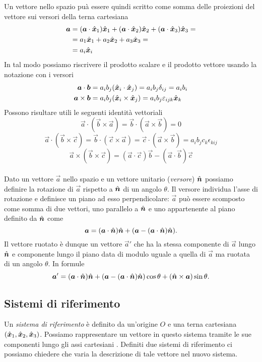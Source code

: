 Un vettore nello spazio puà essere quindi scritto come somma delle proiezioni del vettore sui versori della terna cartesiana 
\begin{align*}
\boldsymbol{a} & = (\boldsymbol{a} \cdot \hat{\boldsymbol{x}}_1) \hat{\boldsymbol{x}}_1 + (\boldsymbol{a} \cdot \hat{\boldsymbol{x}}_2) \hat{\boldsymbol{x}}_2 + (\boldsymbol{a} \cdot \hat{\boldsymbol{x}}_3) \hat{\boldsymbol{x}}_3 = \\
& = a_1 \hat{\boldsymbol{x}}_1 + a_2 \hat{\boldsymbol{x}}_2 + a_3 \hat{\boldsymbol{x}}_3 = \\
& = a_i \hat{\boldsymbol{x}}_i
\end{align*}
In tal modo possiamo riscrivere il prodotto scalare e il prodotto vettore usando la notazione con i versori
\begin{align}\label{dot_product}
\boldsymbol{a} \cdot \boldsymbol{b} & = a_i b_j (\hat{\boldsymbol{x}}_i \cdot \hat{\boldsymbol{x}}_j) = a_i b_j \delta_{ij} = a_i b_i \\
\label{cross product}
\boldsymbol{a} \times \boldsymbol{b} & = a_i b_j (\hat{\boldsymbol{x}}_i \times \hat{\boldsymbol{x}}_j) = a_i b_j \varepsilon_{ijk} \hat{\boldsymbol{x}}_k
\end{align}
Possono risultare utili le seguenti identità vettoriali
\[\vec a \cdot (\vec b \times \vec a) = \vec b \cdot (\vec a \times \vec b) = 0\] 
\[\vec a \cdot (\vec b \times \vec c) = \vec b \cdot (\vec c \times \vec a) = \vec c \cdot (\vec a \times \vec b) = a_i b_j c_k \epsilon_{kij}\]
\[\vec a \times (\vec b \times \vec c) = (\vec a \cdot \vec c) \vec b - (\vec a \cdot \vec b) \vec c\] \\

Dato un vettore $ \vec a $ nello spazio e un vettore unitario (\emph{versore}) $ \hat{\boldsymbol{n}} $ possiamo definire la rotazione di $ \vec a $ rispetto a $ \hat{\boldsymbol{n}} $ di un angolo $ \theta $. Il versore individua l'asse di rotazione e definisce un piano ad esso perpendicolare: $ \vec a $ può essere scomposto come somma di due vettori, uno parallelo a $ \hat{\boldsymbol{n}} $ e uno appartenente al piano definito da $ \hat{\boldsymbol{n}} $ come \[\boldsymbol{a} = (\boldsymbol{a} \cdot \hat{\boldsymbol{n}}) \hat{\boldsymbol{n}} + (\boldsymbol{a} - (\boldsymbol{a} \cdot \hat{\boldsymbol{n}}) \hat{\boldsymbol{n}}).\]
Il vettore ruotato è dunque un vettore $ \vec a' $ che ha la stessa componente di $ \vec a $ lungo $ \hat{\boldsymbol{n}} $ e componente lungo il piano data di modulo uguale a quella di $ \vec a $ ma ruotata di un angolo $ \theta $. In formule \[\boldsymbol{a}' = (\boldsymbol{a} \cdot \hat{\boldsymbol{n}}) \hat{\boldsymbol{n}} + (\boldsymbol{a} - (\boldsymbol{a} \cdot \hat{\boldsymbol{n}}) \hat{\boldsymbol{n}})\cos \theta + (\hat{\boldsymbol{n}} \times \boldsymbol{a}) \sin \theta.\] 

\subsection{Sistemi di riferimento}
Un \emph{sistema di riferimento} è definito da un'origine $ O $ e una terna cartesiana $ (\hat{\boldsymbol{x}}_1, \hat{\boldsymbol{x}}_2, \hat{\boldsymbol{x}}_3) $. Possiamo rappresentare un vettore in questo sistema tramite le sue componenti lungo gli assi cartesiani . Definiti due sistemi di riferimento ci possiamo chiedere che varia la descrizione di tale vettore nel nuovo sistema. \\

